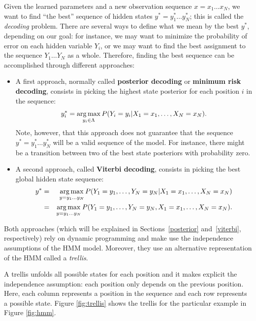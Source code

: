 Given the learned parameters and a new
observation sequence $x = x_1\ldots x_N$, we want to find ``the best'' sequence of hidden states 
$y^* = y_1^* \ldots y_N^*$;
 this is called the \emph{decoding} problem. There are several ways to define what we mean by the best
$y^*$, depending on our goal: for instance, we may want to minimize the probability of error
on each hidden
variable $Y_i$, or we may want to find the best assignment
to the sequence $Y_1\ldots Y_N$ as a whole. 
Therefore, finding the best sequence
can be accomplished through different approaches:

\begin{itemize}
\item A first approach, normally called \textbf{posterior decoding} or \textbf{minimum risk decoding}, consists
in picking the highest state posterior for each position $i$ in the sequence:
\begin{equation}
y_i^* = \operatorname*{arg\,max}_{y_i \in \Lambda} P(Y_i=y_i | X_1=x_1,\ldots,X_N =x_N).
\end{equation}
Note, however, that this approach does not guarantee that the sequence $y^*=y_1^* \ldots y_N^*$ will be a
valid sequence of the model. For instance, there might be a transition
between two of the best state posteriors with probability zero. 

\item A second approach, called \textbf{Viterbi decoding}, consists in
picking the best global hidden state sequence: 
\begin{eqnarray}
y^* &=& \operatorname*{arg\,max}_{y = y_1\ldots y_N} P(Y_1=y_1,\ldots, Y_N=y_N | X_1=x_1,\ldots,X_N =x_N)\nonumber\\
&=& \operatorname*{arg\,max}_{y = y_1\ldots y_N} P(Y_1=y_1,\ldots, Y_N=y_N, X_1=x_1,\ldots,X_N =x_N).
\end{eqnarray}
\end{itemize}

Both approaches (which will be explained in Sections~\ref{posterior} and~\ref{viterbi}, respectively) rely on dynamic programming and make use the
independence assumptions of the HMM model. Moreover, they use an alternative
representation of the HMM called a \emph{trellis}. 

A trellis unfolds all possible states for each position and it makes explicit the independence assumption: each position only
depends on the previous position. Here, each column represents a position in the sequence and each row represents a possible state. Figure \ref{fig:trellis} shows the
trellis for the particular example in Figure \ref{fig:hmm}. 

